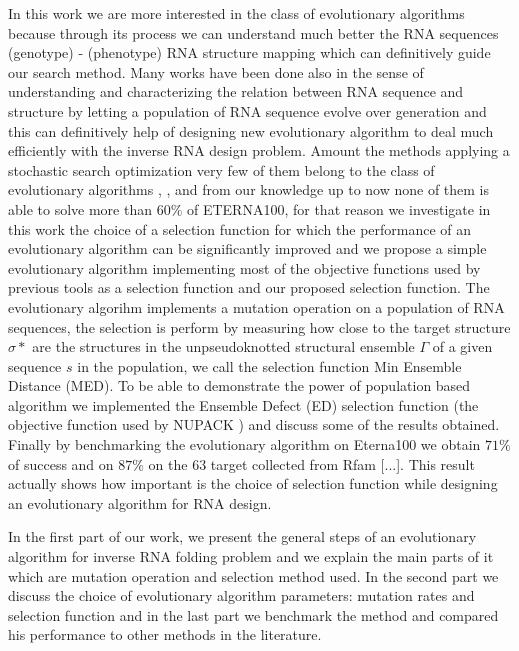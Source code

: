 \documentclass[english,12pt,a4paper]{article}
\theoremstyle{definition}
\begin{document}
 In this work we are more interested in the class of evolutionary algorithms because through its process we can understand much better the RNA sequences (genotype) - (phenotype) RNA structure mapping which can definitively guide our search method. Many works have been done also in the sense of understanding and characterizing the relation between RNA sequence and structure by letting a population of RNA sequence evolve over generation\cite{ancel2000plasticity} and this can definitively help of designing new evolutionary algorithm to deal much efficiently with the inverse RNA design problem. Amount the methods applying a stochastic search optimization very  few of them belong to the class of evolutionary algorithms \cite{esmaili2015erd}, \cite{esmaili2014evolutionary}, \cite{taneda2011modena} and from our knowledge up to now none of them is able to solve more than $60\%$ of ETERNA100, for that reason we investigate in this work the choice of a selection function for which the performance of an evolutionary algorithm can be significantly improved and we propose a simple evolutionary algorithm implementing most of the objective functions used by previous tools as a selection function and our proposed selection function.  The evolutionary algorihm implements a mutation operation on a population of RNA sequences, the selection is perform by measuring how close to the target structure $\sigma*$ are the structures in the unpseudoknotted structural ensemble $ \Gamma$ of a given sequence $s$ in the population, we call the selection function Min Ensemble Distance (MED). To be able to demonstrate the power of population based algorithm we implemented the Ensemble Defect (ED) selection function (the objective function used by NUPACK ) and discuss some of the results obtained. Finally by benchmarking the evolutionary algorithm on Eterna100 we obtain $71\%$ of success and on $87\%$ on the $63$ target collected from Rfam [...]. This result actually shows how important is the choice of selection function while designing an evolutionary algorithm for  RNA design. 

In the first part of our work, we present the general steps of an evolutionary algorithm for inverse RNA folding problem and we explain the main parts of it which are mutation operation and selection method used. In the second part we discuss the choice of evolutionary algorithm parameters: mutation rates and selection function and in the last part we benchmark the method and compared his performance to other methods in the literature.
\end{document}
